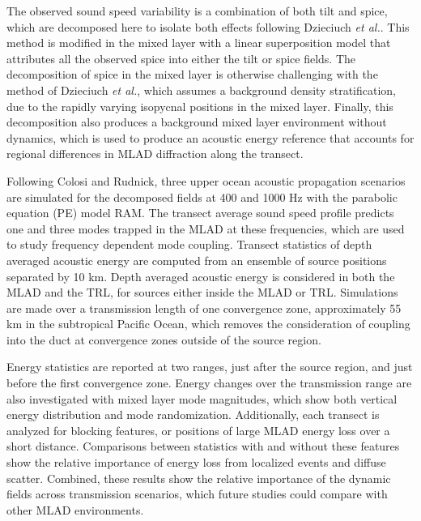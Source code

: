 \documentclass[preprint,NumberedRefs]{JASA}
\begin{document}
The observed sound speed variability is a combination of both tilt and spice, which are decomposed here to isolate both effects following Dzieciuch \emph{et al.}.\citep{dzieciuch2004} This method is modified in the mixed layer with a linear superposition model that attributes all the observed spice into either the tilt or spice fields. The decomposition of spice in the mixed layer is otherwise challenging with the method of Dzieciuch \emph{et al.},\cite{dzieciuch2004} which assumes a background density stratification, due to the rapidly varying isopycnal positions in the mixed layer. Finally, this decomposition also produces a background mixed layer environment without dynamics, which is used to produce an acoustic energy reference that accounts for regional differences in MLAD diffraction along the transect.

Following Colosi and Rudnick,\cite{colosi2020observations} three upper ocean acoustic propagation scenarios are simulated for the decomposed fields at 400 and 1000 Hz with the parabolic equation (PE) model RAM\cite{collins93}. The transect average sound speed profile predicts one and three modes trapped in the MLAD at these frequencies, which are used to study frequency dependent mode coupling. Transect statistics of depth averaged acoustic energy are computed from an ensemble of source positions separated by 10 km. Depth averaged acoustic energy is considered in both the MLAD and the TRL, for sources either inside the MLAD or TRL. Simulations are made over a transmission length of one convergence zone,\citep{jensen2011computational} approximately 55 km in the subtropical Pacific Ocean, which removes the consideration of coupling into the duct at convergence zones outside of the source region.\citep{colosi2020observations}

Energy statistics are reported at two ranges, just after the source region, and just before the first convergence zone. Energy changes over the transmission range are also investigated with mixed layer mode magnitudes, which show both vertical energy distribution and mode randomization. Additionally, each transect is analyzed for blocking features,\citep{colosi2020observations} or positions of large MLAD energy loss over a short distance. Comparisons between statistics with and without these features show the relative importance of energy loss from localized events and diffuse scatter. Combined, these results show the relative importance of the dynamic fields across transmission scenarios, which future studies could compare with other MLAD environments.
\end{document}
